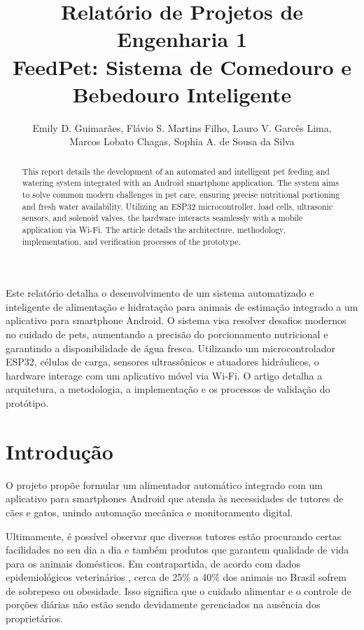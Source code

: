 \documentclass[12pt]{article}
\title{Relatório de Projetos de Engenharia 1\\ FeedPet: Sistema de Comedouro e Bebedouro Inteligente}
\author{Emily D. Guimarães\inst{1}, Flávio S. Martins Filho\inst{1}, Lauro V. Garcês Lima\inst{1},\\
Marcos Lobato Chagas\inst{1}, Sophia A. de Sousa da Silva\inst{1}}
\begin{document}
 

\maketitle

\begin{abstract}
  This report details the development of an automated and intelligent pet feeding and watering system integrated with an Android smartphone application. The system aims to solve common modern challenges in pet care, ensuring precise nutritional portioning and fresh water availability. Utilizing an ESP32 microcontroller, load cells, ultrasonic sensors, and solenoid valves, the hardware interacts seamlessly with a mobile application via Wi-Fi. The article details the architecture, methodology, implementation, and verification processes of the prototype.
\end{abstract}
     
\begin{resumo}
  Este relatório detalha o desenvolvimento de um sistema automatizado e inteligente de alimentação e hidratação para animais de estimação integrado a um aplicativo para smartphone Android. O sistema visa resolver desafios modernos no cuidado de pets, aumentando a precisão do porcionamento nutricional e garantindo a disponibilidade de água fresca. Utilizando um microcontrolador ESP32, células de carga, sensores ultrassônicos e atuadores hidráulicos, o hardware interage com um aplicativo móvel via Wi-Fi. O artigo detalha a arquitetura, a metodologia, a implementação e os processos de validação do protótipo.
\end{resumo}

\section{Introdução}

O projeto propõe formular um alimentador automático integrado com um aplicativo para smartphones Android que atenda às necessidades de tutores de cães e gatos, unindo automação mecânica e monitoramento digital.

Ultimamente, é possível observar que diversos tutores estão procurando certas facilidades no seu dia a dia e também produtos que garantem qualidade de vida para os animais domésticos. Em contrapartida, de acordo com dados epidemiológicos veterinários \cite{folha:23}, cerca de 25\% a 40\% dos animais no Brasil sofrem de sobrepeso ou obesidade. Isso significa que o cuidado alimentar e o controle de porções diárias não estão sendo devidamente gerenciados na ausência dos proprietários.
\end{document}
